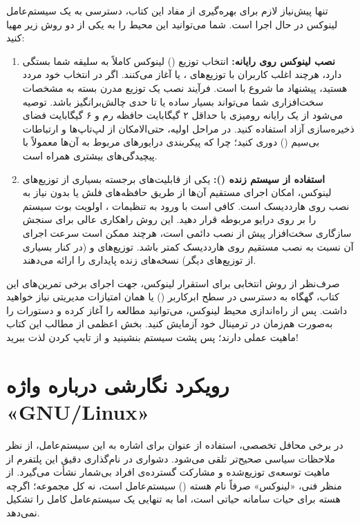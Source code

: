 تنها پیش‌نیاز لازم برای بهره‌گیری از مفاد این کتاب، دسترسی به یک سیستم‌عامل لینوکس در حال اجرا است. شما می‌توانید این محیط را به یکی از دو روش زیر مهیا کنید:

\begin{enumerate}
  \item \textbf{نصب لینوکس روی رایانه:} انتخاب توزیع () لینوکس کاملاً به سلیقه شما بستگی دارد، هرچند اغلب کاربران با توزیع‌های ،  یا  آغاز می‌کنند. اگر در انتخاب خود مردد هستید، پیشنهاد ما شروع با  است. فرآیند نصب یک توزیع مدرن بسته به مشخصات سخت‌افزاری شما می‌تواند بسیار ساده یا تا حدی چالش‌برانگیز باشد. توصیه می‌شود از یک رایانه رومیزی با حداقل ۲ گیگابایت حافظه رم و ۶ گیگابایت فضای ذخیره‌سازی آزاد استفاده کنید. در مراحل اولیه، حتی‌الامکان از لپ‌تاپ‌ها و ارتباطات بی‌سیم () دوری کنید؛ چرا که پیکربندی درایورهای مربوط به آن‌ها معمولاً با پیچیدگی‌های بیشتری همراه است.
  \item \textbf{استفاده از سیستم زنده ():} یکی از قابلیت‌های برجسته بسیاری از توزیع‌های لینوکس، امکان اجرای مستقیم آن‌ها از طریق حافظه‌های فلش یا  بدون نیاز به نصب روی هارددیسک است. کافی است با ورود به تنظیمات ، اولویت بوت سیستم را بر روی درایو مربوطه قرار دهید. این روش راهکاری عالی برای سنجش سازگاری سخت‌افزار پیش از نصب دائمی است، هرچند ممکن است سرعت اجرای آن نسبت به نصب مستقیم روی هارددیسک کمتر باشد. توزیع‌های  و  (در کنار بسیاری از توزیع‌های دیگر) نسخه‌های زنده پایداری را ارائه می‌دهند.
\end{enumerate}

صرف‌نظر از روش انتخابی برای استقرار لینوکس، جهت اجرای برخی تمرین‌های این کتاب، گهگاه به دسترسی در سطح ابرکاربر () یا همان امتیازات مدیریتی نیاز خواهید داشت. پس از راه‌اندازی محیط لینوکس، می‌توانید مطالعه را آغاز کرده و دستورات را به‌صورت هم‌زمان در ترمینال خود آزمایش کنید. بخش اعظمی از مطالب این کتاب ماهیت عملی دارند؛ پس پشت سیستم بنشینید و از تایپ کردن لذت ببرید!

\section*{رویکرد نگارشی درباره واژه «GNU/Linux»}

در برخی محافل تخصصی، استفاده از عنوان  برای اشاره به این سیستم‌عامل، از نظر ملاحظات سیاسی صحیح‌تر تلقی می‌شود. دشواری در نام‌گذاری دقیق این پلتفرم از ماهیت توسعه‌ی توزیع‌شده و مشارکت گسترده‌ی افراد بی‌شمار نشأت می‌گیرد. از منظر فنی، «لینوکس» صرفاً نام هسته () سیستم‌عامل است، نه کل مجموعه؛ اگرچه هسته برای حیات سامانه حیاتی است، اما به تنهایی یک سیستم‌عامل کامل را تشکیل نمی‌دهد.

